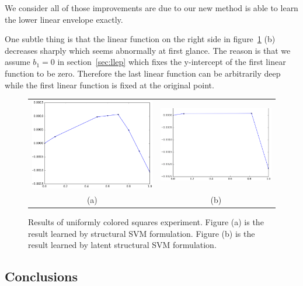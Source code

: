 We consider all of those improvements are due to our new method
is able to learn the lower linear envelope exactly.

One subtle thing is that the linear function on the right side in
figure~\ref{fig:ba_res} (b) decreases sharply which seems
abnormally at first glance. The reason is that we assume $b_1=0$
in section~\ref{sec:llep} which fixes the y-intercept of the
first linear function to be zero. Therefore the last linear
function can be arbitrarily deep while the first linear function
is fixed at the original point.

\clearpage

\begin{figure}[ht]
  \centering
  \setlength{\tabcolsep}{2pt}
  \begin{tabular}{cc}
    \includegraphics[width=0.5\columnwidth]{Experiments/figures/ba_res_old.png}&
                                                                            \includegraphics[width=0.55\columnwidth]{Experiments/figures/ba_res_new.png}\\
    {\small (a)} & {\small (b)} 
  \end{tabular}
  \caption{\label{fig:ba_res} Results of uniformly colored
    squares experiment. Figure (a) is the result learned by
    structural SVM formulation. Figure (b) is the result learned
    by latent structural SVM formulation.}
\end{figure}

\subsection{Conclusions}
\label{sec:synth-check-conc}

